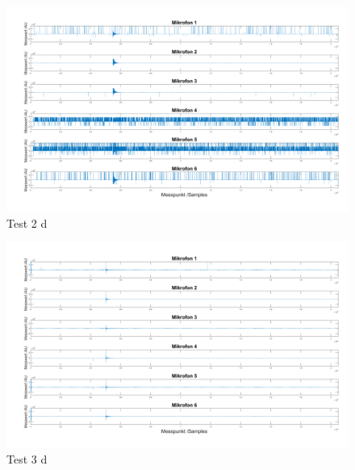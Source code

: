 \begin{figure}[h]
	\begin{center}
		\includegraphics[width=\textwidth]{Sections/Programmierung/Test_2_d}
	\end{center}
	\caption{Test 2 d}
	\label{fig:Test_2_d}
\end{figure}

\begin{figure}[h]
	\begin{center}
		\includegraphics[width=\textwidth]{Sections/Programmierung/Test_3_d}
	\end{center}
	\caption{Test 3 d}
	\label{fig:Test_3_d}
\end{figure}

\newpage